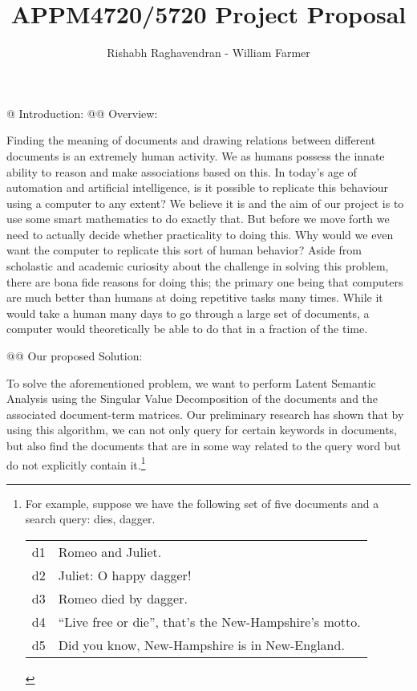 \documentclass[10pt]{article}
\title{APPM4720/5720 Project Proposal}
\author{Rishabh Raghavendran - William Farmer}
\begin{document}
\maketitle

\begin{easylist}[enumerate]
    @ Introduction:
    @@ Overview:

    Finding the meaning of documents and drawing relations between different
    documents is an extremely human activity. We as humans possess the innate
    ability to reason and make associations based on this. In today's age of
    automation and artificial intelligence, is it possible to replicate this
    behaviour using a computer to any extent? We believe it is and the aim of our
    project is to use some smart mathematics to do exactly that. But before we move
    forth we need to actually decide whether practicality to doing this. Why would
    we even want the computer to replicate this sort of human behavior?  Aside from
    scholastic and academic curiosity about the challenge in solving this problem,
    there are bona fide reasons for doing this; the primary one being that computers
    are much better than humans at doing repetitive tasks many times.  While it
    would take a human many days to go through a large set of documents, a computer
    would theoretically be able to do that in a fraction of the time. 

    @@ Our proposed Solution:

    To solve the aforementioned problem, we want to perform Latent Semantic
    Analysis using the Singular Value Decomposition of the documents and the
    associated document-term matrices. Our preliminary research has shown that
    by using this algorithm, we can not only query for certain keywords in
    documents, but also  find the documents that are in some way related  to the
    query word but do not explicitly contain it.\footnote{%
    For example, suppose we have the following set of five documents and a
    search query: dies, dagger.

    \begin{table}[H]
        \centering
        \begin{tabular}{ll}
            d1 & Romeo and Juliet. \\
            d2 & Juliet: O happy dagger! \\
            d3 & Romeo died by dagger. \\
            d4 & ``Live free or die'', that's the New-Hampshire's motto. \\
            d5 & Did you know, New-Hampshire is in New-England. \\
        \end{tabular}
    \end{table}
 
}
\end{easylist}
\end{document}
